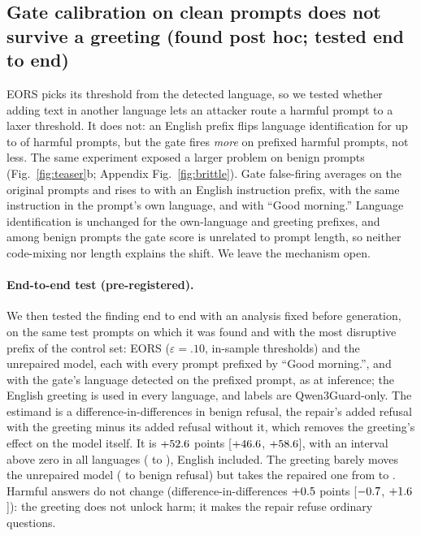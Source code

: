 \documentclass{article}
\newcommand{\ci}[2]{{\small[$#1$, $#2$]}}
\begin{document}
\subsection{Gate calibration on clean prompts does not survive a greeting (found post hoc; tested end to end)}
\label{sec:brittle}
EORS picks its threshold from the detected language, so we tested whether adding text in another language lets an attacker route a harmful prompt to a laxer threshold. It does not: an English prefix flips language identification for up to \BritLidFlipMax{} of harmful prompts, but the gate fires \emph{more} on prefixed harmful prompts, not less.
The same experiment exposed a larger problem on benign prompts (Fig.~\ref{fig:teaser}b; Appendix Fig.~\ref{fig:brittle}). Gate false-firing averages \BritOrigMean{} on the original prompts and rises to \BritEnMean{} with an English instruction prefix, \BritNativeMean{} with the same instruction in the prompt's own language, and \BritGreetMean{} with ``Good morning.'' Language identification is unchanged for the own-language and greeting prefixes, and among benign prompts the gate score is unrelated to prompt length, so neither code-mixing nor length explains the shift. We leave the mechanism open.

\paragraph{End-to-end test (pre-registered).} We then tested the finding end to end with an analysis fixed before generation, on the same test prompts on which it was found and with the most disruptive prefix of the control set: EORS ($\varepsilon{=}.10$, in-sample thresholds) and the unrepaired model, each with every prompt prefixed by ``Good morning.'', and with the gate's language detected on the prefixed prompt, as at inference; the English greeting is used in every language, and labels are Qwen3Guard-only. The estimand is a difference-in-differences in benign refusal, the repair's added refusal with the greeting minus its added refusal without it, which removes the greeting's effect on the model itself. It is $+52.6$ points \ci{\GreetDidLo}{\GreetDidHi}, with an interval above zero in all \GreetDidNPos{} languages (\GreetDidLangMin{} to \GreetDidLangMax{}), English included. The greeting barely moves the unrepaired model (\GreetBrrEZero{} to \GreetBrrEZeroGreet{} benign refusal) but takes the repaired one from \GreetBrrEors{} to \GreetBrrEorsGreet. Harmful answers do not change (difference-in-differences $+0.5$ points \ci{\GreetDidUnsafeLo}{\GreetDidUnsafeHi}): the greeting does not unlock harm; it makes the repair refuse ordinary questions.
\end{document}
